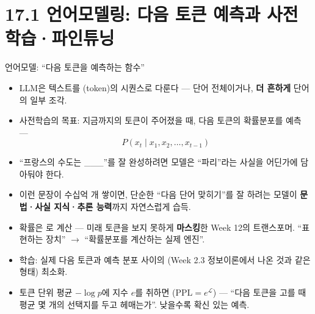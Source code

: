 \section{17.1 언어모델링: 다음 토큰 예측과 사전학습·파인튜닝}
\begin{frame}{언어모델: ``다음 토큰을 예측하는 함수''}
  \begin{itemize}
    \item LLM은 텍스트를 (token)의 시퀀스로 다룬다 —
      단어 전체이거나, \textbf{더 흔하게} 단어의 일부 조각.
    \item 사전학습의 목표: 지금까지의 토큰이 주어졌을 때,
      다음 토큰의 확률분포를 예측 ---
      \[P(x_t \mid x_1, x_2, \ldots, x_{t-1})\]
    \item ``프랑스의 수도는 \_\_\_''를 잘 완성하려면 모델은
      ``파리''라는 사실을 어딘가에 담아둬야 한다.
    \item 이런 문장이 수십억 개 쌓이면, 단순한 ``다음 단어
      맞히기''를 잘 하려는 모델이 \textbf{문법·사실 지식·추론
      능력}까지 자연스럽게 습득.
    \item 확률은 로 계산 — 미래
      토큰을 보지 못하게 \textbf{마스킹}한 Week 12의 트랜스포머.
      ``표현하는 장치'' $\to$ ``확률분포를 계산하는 실제 엔진''.
    \item 학습: 실제 다음 토큰과 예측 분포 사이의
      (Week 2.3 정보이론에서 나온 것과
      같은 형태) 최소화.
    \item 토큰 단위 평균 $-\log p$에 지수 $e$를 취하면
      ($\text{PPL} = e^{\mathcal{L}}$) — ``다음
      토큰을 고를 때 평균 몇 개의 선택지를 두고 헤매는가''.
      낮을수록 확신 있는 예측.
  \end{itemize}
\end{frame}
